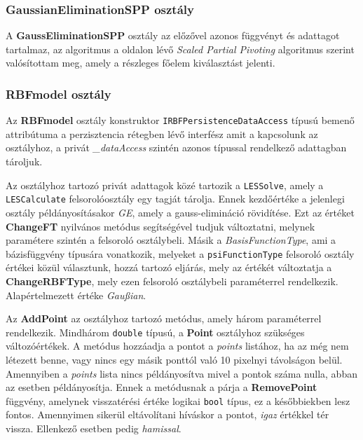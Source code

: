 		\subsubsection{GaussianEliminationSPP osztály}
		
			A \textbf{GaussEliminationSPP} osztály az előzővel azonos függvényt és adattagot  tartalmaz, az algoritmus a \cite{gaussian} oldalon lévő \textit{Scaled Partial Pivoting} algoritmus szerint valósítottam meg, amely a részleges főelem kiválasztást jelenti.
			
		\subsubsection{RBFmodel osztály}%
		
			Az \textbf{RBFmodel} osztály konstruktor \texttt{IRBFPersistenceDataAccess} típusú bemenő attribútuma a perzisztencia rétegben lévő interfész amit a kapcsolunk az osztályhoz, a privát \textit{\_dataAccess} szintén azonos típussal rendelkező adattagban tároljuk.
			
			Az osztályhoz tartozó privát adattagok közé tartozik a \texttt{LESSolve}, amely a \texttt{LESCalculate} felsorolóosztály egy tagját tárolja. Ennek kezdőértéke a jelenlegi osztály példányosításakor \textit{GE}, amely a gauss-elimináció rövidítése. Ezt az értéket \textbf{ChangeFT} nyilvános metódus segítségével tudjuk  változtatni, melynek paramétere szintén a felsoroló osztálybeli. Másik a \textit{BasisFunctionType}, ami a bázisfüggvény típusára vonatkozik, melyeket a \texttt{psiFunctionType} felsoroló osztály értékei közül választunk, hozzá tartozó eljárás, mely az értékét változtatja a \textbf{ChangeRBFType}, mely ezen felsoroló osztálybeli paraméterrel rendelkezik. Alapértelmezett értéke \textit{Gaußian}. 
			 
			Az \textbf{AddPoint} az osztályhoz tartozó metódus, amely három paraméterrel rendelkezik. Mindhárom \texttt{double} típusú, a \textbf{Point} osztályhoz szükséges változóértékek. A metódus hozzáadja a pontot a \textit{points} listához, ha az még nem létezett benne, vagy nincs egy másik ponttól való 10 pixelnyi távolságon belül. Amennyiben a \textit{points} lista nincs példányosítva mivel a pontok száma nulla, abban az esetben példányosítja. Ennek a metódusnak a párja a \textbf{RemovePoint} függvény, amelynek visszatérési értéke logikai \texttt{bool} típus, ez a későbbiekben lesz fontos. Amennyimen sikerül eltávolítani híváskor a pontot, \textit{igaz} értékkel tér vissza. Ellenkező esetben pedig \textit{hamissal}.
			
